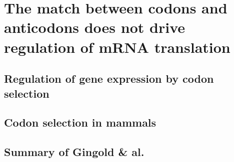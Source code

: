 \chapter{The match between codons and anticodons does not drive regulation of mRNA translation}

\section{Regulation of gene expression by codon selection}

\section{Codon selection in mammals}

\section{Summary of Gingold \& al.}
